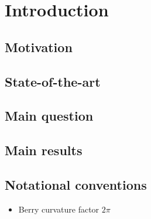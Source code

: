 \chapter{Introduction}

\section{Motivation}

\section{State-of-the-art} %

\section{Main question}

\section{Main results}

\section{Notational conventions}

{\color{blue}
\begin{itemize}
	\item Berry curvature factor $2\pi$ %
\end{itemize}
}